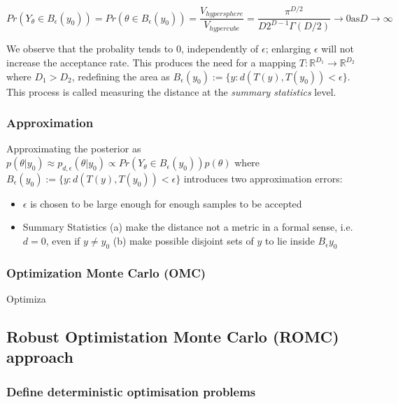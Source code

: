 \documentclass[11pt,twoside]{article}
\numberwithin{Theorem}{section}
\numberwithin{Definition}{section}
\numberwithin{Lemma}{section}
\numberwithin{Algorithm}{section}
\numberwithin{equation}{section}
\begin{document}
\begin{equation}
  Pr(Y_\theta \in B_\epsilon(y_0)) = Pr(\theta \in B_\epsilon(y_0)) = \frac{V_{hypersphere}}{V_{hypercube}} = \frac{\pi^{D/2}}{D2^{D-1}\Gamma(D/2)} \rightarrow 0 \text{as} D \rightarrow \infty
\end{equation}

We observe that the probality tends to $0$, independently of $\epsilon$; enlarging $\epsilon$ will not increase the acceptance rate. This produces the need for a mapping $T: \mathbb{R}^{D_1} \rightarrow \mathbb{R}^{D_2}$ where $D_1 > D_2$, redefining the area as $B_\epsilon(y_0) := \{y: d(T(y), T(y_0)) < \epsilon \}$. This process is called measuring the distance at the \textit{summary statistics} level.

\subsubsection{Approximation}

Approximating the posterior as $p(\theta|y_0) \approx p_{d,\epsilon}(\theta|y_0) \propto Pr(Y_\theta \in B_\epsilon(y_0))p(\theta)$ where $B_\epsilon(y_0) := \{y: d(T(y), T(y_0)) < \epsilon \}$ introduces two approximation errors:

\begin{itemize}
\item $\epsilon$ is chosen to be large enough for enough samples to be accepted
  \item Summary Statistics (a) make the distance not a metric in a formal sense, i.e. $d = 0$, even if $y \neq y_0$ (b) make possible disjoint sets of $y$ to lie inside $B_\epsilon{y_0}$
  \end{itemize}

\subsubsection{Optimization Monte Carlo (OMC)}

Optimiza

\subsection{Robust Optimistation Monte Carlo (ROMC) approach}
\label{sec:Techniques}

\subsubsection{Define deterministic optimisation problems}
\end{document}
